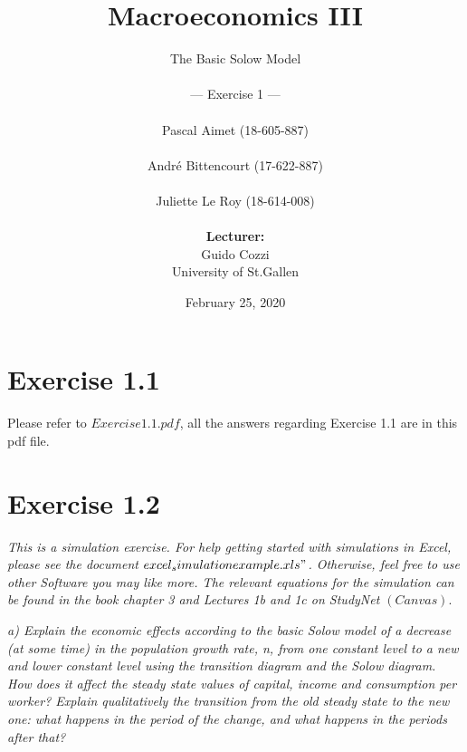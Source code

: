 \documentclass[11pt]{article} %
\begin{document}
\title{\huge{Macroeconomics III}}

\author{The Basic Solow Model\\
    \\
    --- Exercise 1 ---\\
    \\
    Pascal Aimet (18-605-887)\\
    \\ 
    André Bittencourt (17-622-887)\\
    \\
    Juliette Le Roy (18-614-008)\\
    \\
    \textbf{Lecturer:}\\Guido Cozzi\\
    University of St.Gallen}
\date{February 25, 2020}
\maketitle
\thispagestyle{empty}

\pagebreak
\section{Exercise 1.1}
Please refer to $Exercise1.1.pdf$, all the answers regarding Exercise 1.1 are in this pdf file. \par
\pagebreak

\section{Exercise 1.2}
\bigskip
\textit{This is a simulation exercise. For help getting started with simulations in Excel, please see the document $excel_simulationexample.xls"$. Otherwise, feel free to use other Software you may like more. The relevant equations for the simulation can be found in the book chapter 3 and Lectures 1b and 1c on StudyNet $(Canvas).$}
\par
\noindent \textit{a) Explain the economic effects according to the basic Solow model of a decrease (at some time) in the population growth rate, n, from one constant level to a new and
lower constant level using the transition diagram and the Solow diagram. How does it affect the steady state values of capital, income and consumption per worker? Explain qualitatively the transition from the old steady state to the new one: what happens in the period of the change, and what happens in the periods after that?}\par
\end{document}
